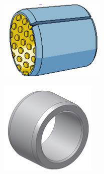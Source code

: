 \documentclass[11pt,oneside]{article}
\begin{document}
\noindent\begin{minipage}[c]{.23\linewidth}
\begin{center}
\includegraphics[width=.75\textwidth]{png/fig11}
\end{center}
\end{minipage}\hfill
\begin{minipage}[c]{.23\linewidth}
\begin{center}
\includegraphics[width=.75\textwidth]{png/fig12}
\end{center}
\end{minipage}\hfill
\end{document}
